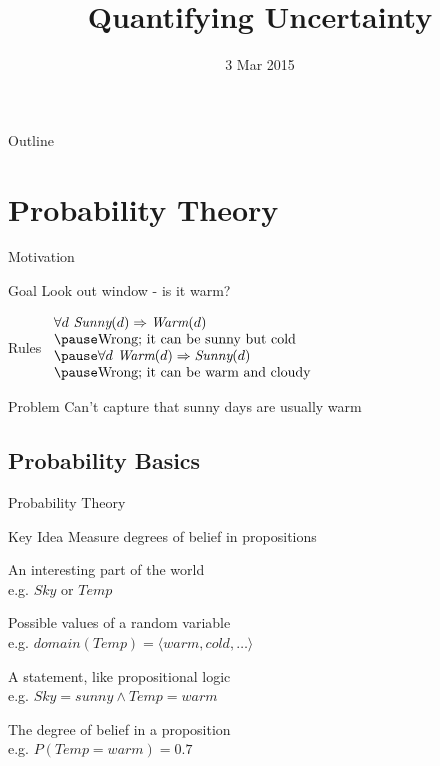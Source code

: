\documentclass[14pt]{beamer}
\title{Quantifying Uncertainty}
\date{3 Mar 2015}
\begin{document}
\begin{frame}
\titlepage
\end{frame}

\begin{frame}{Outline}
\tableofcontents
\end{frame}

\section{Probability Theory}
\begin{frame}{Motivation}
	\begin{block}{Goal}
		Look out window - is it warm?
	\end{block}
	\pause
	\begin{block}{Rules}
		$
		\begin{array}{l}
			\forall d\ \textit{Sunny}(d) \Rightarrow \textit{Warm}(d) \\
			\pause \mbox{Wrong; it can be sunny but cold} \\
			\pause \forall d\ \textit{Warm}(d) \Rightarrow \textit{Sunny}(d) \\
			\pause\mbox{Wrong; it can be warm and cloudy} \\
		\end{array}
		$
	\end{block}
	\pause
	\begin{block}{Problem}
		Can't capture that sunny days are usually warm
	\end{block}
\end{frame}


\subsection{Probability Basics}

\begin{frame}{Probability Theory}
\begin{block}{Key Idea}
Measure degrees of belief in propositions
\end{block}
\bigskip
\begin{description}
\pause
\item[Random Variable]
An interesting part of the world \\
e.g. $\textit{Sky}$ or $\textit{Temp}$
\pause
\item[Domain]
Possible values of a random variable \\
e.g. $\textit{domain}(\textit{Temp})=\langle\textit{warm}, \textit{cold}, \ldots\rangle$
\pause
\item[Proposition]
A statement, like propositional logic \\
e.g. $\textit{Sky} = \textit{sunny} \land \textit{Temp} = \textit{warm}$
\pause
\item[Probability]
The degree of belief in a proposition \\
e.g. $P(\textit{Temp} = \textit{warm}) = 0.7$
\end{description}
\end{frame}
\end{document}
